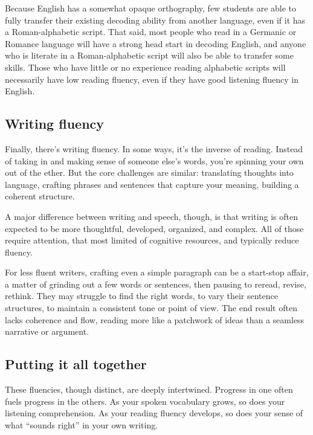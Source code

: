 Because English has a somewhat opaque orthography, few students are able to fully transfer their existing decoding ability from another language, even if it has a Roman-alphabetic script. That said, most people who read in a Germanic or Romance language will have a strong head start in decoding English, and anyone who is literate in a Roman-alphabetic script will also be able to transfer some skills. Those who have little or no experience reading alphabetic scripts will necessarily have low reading fluency, even if they have good listening fluency in English.

\subsection{Writing fluency}

Finally, there's writing fluency. In some ways, it's the inverse of reading. Instead of taking in and making sense of someone else's words, you're spinning your own out of the ether. But the core challenges are similar: translating thoughts into language, crafting phrases and sentences that capture your meaning, building a coherent structure.

A major difference between writing and speech, though, is that writing is often expected to be more thoughtful, developed, organized, and complex. All of those require attention, that most limited of cognitive resources, and typically reduce fluency.

For less fluent writers, crafting even a simple paragraph can be a start-stop affair, a matter of grinding out a few words or sentences, then pausing to reread, revise, rethink. They may struggle to find the right words, to vary their sentence structures, to maintain a consistent tone or point of view. The end result often lacks coherence and flow, reading more like a patchwork of ideas than a seamless narrative or argument.

\subsection{Putting it all together}

These fluencies, though distinct, are deeply intertwined. Progress in one often fuels progress in the others. As your spoken vocabulary grows, so does your listening comprehension. As your reading fluency develops, so does your sense of what \enquote{sounds right} in your own writing.

